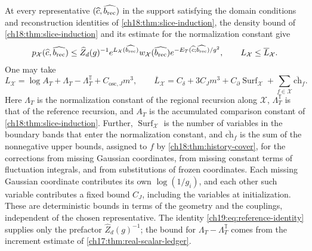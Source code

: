 \begin{theorem}
At every representative $(\widehat c,\widehat{b_{\mathrm{rec}}})$ in the support satisfying the domain conditions and reconstruction identities of \cref{ch18:thm:slice-induction}, the density bound of \cref{ch18:thm:slice-induction} and its estimate for the normalization constant give
\[
 p_{\mathcal X}(\widehat c,\widehat{b_{\mathrm{rec}}})\le\widehat Z_d(g)^{-1}e^{L_{\mathcal X}(\widehat{b_{\mathrm{rec}}})}w_{\mathcal X}(\widehat{b_{\mathrm{rec}}})e^{-E_T(\widehat c;\widehat{b_{\mathrm{rec}}})/g^2},
 \qquad L_{\mathcal X}\le\overline L_{\mathcal X}.
\]
One may take
\[
 L_{\mathcal X}=\log A_T+\Lambda_T-\Lambda_T^{\mathbb T}+C_{\mathrm{osc},J}m^3,
 \qquad
 \overline L_{\mathcal X}=C_\delta+3C_Jm^3+C_\partial\operatorname{Surf}_{\mathcal X}+\sum_{f\in\mathcal X}\overline{\mathrm{ch}}_f.
\]
Here $\Lambda_T$ is the normalization constant of the regional recursion along $\mathcal X$, $\Lambda_T^{\mathbb T}$ is that of the reference recursion, and $A_T$ is the accumulated comparison constant of \cref{ch18:thm:slice-induction}. Further, $\operatorname{Surf}_{\mathcal X}$ is the number of variables in the boundary bands that enter the normalization constant, and $\overline{\mathrm{ch}}_f$ is the sum of the nonnegative upper bounds, assigned to $f$ by \cref{ch18:thm:history-cover}, for the corrections from missing Gaussian coordinates, from missing constant terms of fluctuation integrals, and from substitutions of frozen coordinates. Each missing Gaussian coordinate contributes its own $\log(1/g_i)$, and each other such variable contributes a fixed bound $C_J$, including the variables at initialization. These are deterministic bounds in terms of the geometry and the couplings, independent of the chosen representative. The identity \eqref{ch19:eq:reference-identity} supplies only the prefactor $\widehat Z_d(g)^{-1}$; the bound for $\Lambda_T-\Lambda_T^{\mathbb T}$ comes from the increment estimate of \cref{ch17:thm:real-scalar-ledger}.


\end{theorem}
